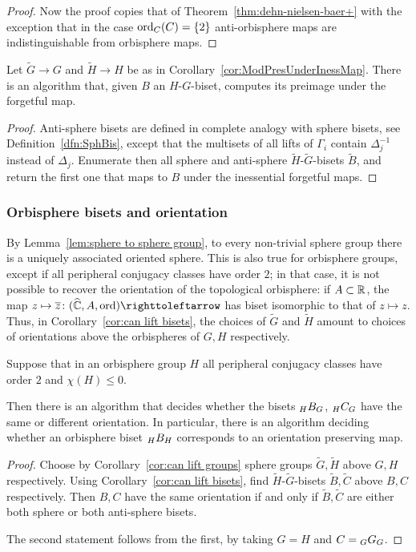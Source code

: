 \documentclass{amsart}
\begin{document}
\begin{proof}
  Now the proof copies that of Theorem~\ref{thm:dehn-nielsen-baer+}
  with the exception that in the case $\operatorname{ord}_C(C)=\{2\}$
  anti-orbisphere maps are indistinguishable from orbisphere maps.
\end{proof}

\begin{cor}\label{cor:can lift bisets}
  Let $\widetilde G\to G$ and $\widetilde H\to H$ be as in
  Corollary~\ref{cor:ModPresUnderInessMap}. There is an algorithm
  that, given $B$ an $H$-$G$-biset, computes its preimage under the
  forgetful map.
\end{cor}
\begin{proof}
Anti-sphere bisets are defined in complete analogy with sphere bisets, see Definition~\ref{dfn:SphBis}, except that the multisets of all lifts of $\Gamma_i$ contain $\Delta^{-1}_j$ instead of $\Delta_j$. Enumerate then all sphere and
  anti-sphere $\widetilde H$-$\widetilde G$-bisets $\tilde B$, and return the
  first one that maps to $B$ under the inessential forgetful maps.
\end{proof}

\subsubsection{Orbisphere bisets and orientation}
By Lemma~\ref{lem:sphere to sphere group}, to every non-trivial sphere group there
is a uniquely associated oriented sphere. This is also true for
orbisphere groups, except if all peripheral conjugacy classes have
order $2$; in that case, it is not possible to recover the orientation
of the topological orbisphere: if $A\subset{\mathbb R}$, the map
$z\mapsto\overline z\colon(\hC,A,\ord)\selfmap$ has biset isomorphic
to that of $z\mapsto z$. Thus, in Corollary~\ref{cor:can lift bisets},
the choices of $\widetilde G$ and $\widetilde H$ amount to choices of
orientations above the orbispheres of $G,H$ respectively.

\begin{prop}
  Suppose that in an orbisphere group $H$ all peripheral conjugacy
  classes have order $2$ and $\chi(H)\le0$.

  Then there is an algorithm that decides whether the bisets
  $\subscript H B_G$, $\subscript H C_G$ have the same or different
  orientation. In particular, there is an algorithm deciding whether
  an orbisphere biset $\subscript H B_H$ corresponds to an orientation
  preserving map.
\end{prop}
\begin{proof}
  Choose by Corollary~\ref{cor:can lift groups} sphere groups
  $\widetilde G,\widetilde H$ above $G,H$ respectively.  Using
  Corollary~\ref{cor:can lift bisets}, find $\widetilde
  H$-$\widetilde G$-bisets $\widetilde B,\widetilde C$ above $B,C$
  respectively. Then $B,C$ have the same orientation if and only if
  $\widetilde B,\widetilde C$ are either both sphere or both
  anti-sphere bisets.

  The second statement follows from the first, by taking $G=H$ and
  $C=\subscript G G_G$.
\end{proof}
\end{document}
